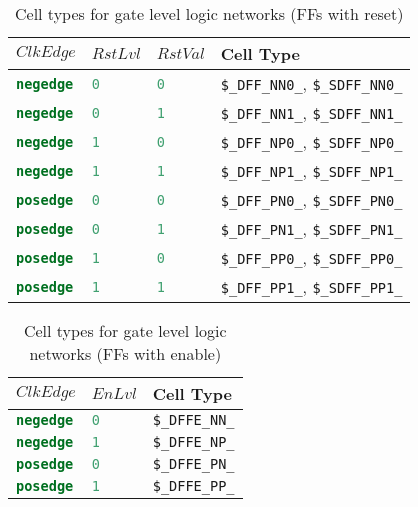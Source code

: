 \begin{table}[t]
\hfil
\begin{tabular}[t]{llll}
$ClkEdge$ & $RstLvl$ & $RstVal$ & Cell Type \\
\hline
\lstinline[language=Verilog];negedge; & \lstinline[language=Verilog];0; & \lstinline[language=Verilog];0; & {\tt \$\_DFF\_NN0\_}, {\tt \$\_SDFF\_NN0\_} \\
\lstinline[language=Verilog];negedge; & \lstinline[language=Verilog];0; & \lstinline[language=Verilog];1; & {\tt \$\_DFF\_NN1\_}, {\tt \$\_SDFF\_NN1\_} \\
\lstinline[language=Verilog];negedge; & \lstinline[language=Verilog];1; & \lstinline[language=Verilog];0; & {\tt \$\_DFF\_NP0\_}, {\tt \$\_SDFF\_NP0\_} \\
\lstinline[language=Verilog];negedge; & \lstinline[language=Verilog];1; & \lstinline[language=Verilog];1; & {\tt \$\_DFF\_NP1\_}, {\tt \$\_SDFF\_NP1\_} \\
\lstinline[language=Verilog];posedge; & \lstinline[language=Verilog];0; & \lstinline[language=Verilog];0; & {\tt \$\_DFF\_PN0\_}, {\tt \$\_SDFF\_PN0\_} \\
\lstinline[language=Verilog];posedge; & \lstinline[language=Verilog];0; & \lstinline[language=Verilog];1; & {\tt \$\_DFF\_PN1\_}, {\tt \$\_SDFF\_PN1\_} \\
\lstinline[language=Verilog];posedge; & \lstinline[language=Verilog];1; & \lstinline[language=Verilog];0; & {\tt \$\_DFF\_PP0\_}, {\tt \$\_SDFF\_PP0\_} \\
\lstinline[language=Verilog];posedge; & \lstinline[language=Verilog];1; & \lstinline[language=Verilog];1; & {\tt \$\_DFF\_PP1\_}, {\tt \$\_SDFF\_PP1\_} \\
\end{tabular}
\caption{Cell types for gate level logic networks (FFs with reset)}
\label{tab:CellLib_gates_adff}
\end{table}

\begin{table}[t]
\hfil
\begin{tabular}[t]{lll}
$ClkEdge$ & $EnLvl$ & Cell Type \\
\hline
\lstinline[language=Verilog];negedge; & \lstinline[language=Verilog];0; & {\tt \$\_DFFE\_NN\_} \\
\lstinline[language=Verilog];negedge; & \lstinline[language=Verilog];1; & {\tt \$\_DFFE\_NP\_} \\
\lstinline[language=Verilog];posedge; & \lstinline[language=Verilog];0; & {\tt \$\_DFFE\_PN\_} \\
\lstinline[language=Verilog];posedge; & \lstinline[language=Verilog];1; & {\tt \$\_DFFE\_PP\_} \\
\end{tabular}
\caption{Cell types for gate level logic networks (FFs with enable)}
\label{tab:CellLib_gates_dffe}
\end{table}

